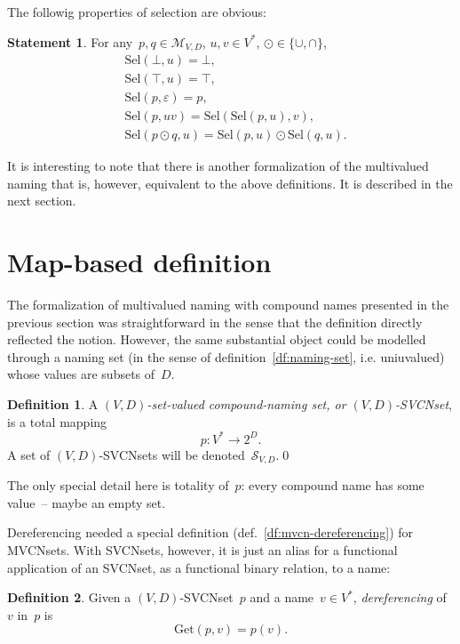 \documentclass{article}
\theoremstyle{definition}
\newtheorem{Df}{Definition}
\newtheorem{St}{Statement}
\newcommand{\setcharmvcn}{M}
\newcommand{\setcharsvcn}{S}
\newcommand{\setsymbol}[3]{\mathcal{#1}_{#2,#3}}
\newcommand{\setmvcn}[2]{\setsymbol{\setcharmvcn}{#1}{#2}}
\newcommand{\setsvcn}[2]{\setsymbol{\setcharsvcn}{#1}{#2}}
\newcommand{\select}{\mathrm{Sel}}
\newcommand{\derefsymbol}{\mathrm{Get}}
\newcommand{\deref}[2]{\derefsymbol(#1, #2)}
\begin{document}
The followig properties of selection are obvious:
\begin{St}\label{st:mvcn-selection-properties}
For any~$p,q\in\setmvcn{V}{D}$, $u, v\in V^\ast$, $\odot\in\{\cup, \cap\}$,
\begin{eqnarray*}
  & \select(\bot,u) = \bot, \\
  & \select(\top,u) = \top, \\
  & \select(p,\varepsilon) = p, \\
  & \select(p,uv) = \select(\select(p,u), v), \\
  & \select(p\odot q, u) = \select(p,u)\odot \select(q,u).
\end{eqnarray*}
\end{St}

It is interesting to note that there is another formalization of the
multivalued naming that is, however, equivalent to the above definitions.  It
is described in the next section.

\section{Map-based definition}

The formalization of multivalued naming with compound names presented in the
previous section was straightforward in the sense that the definition directly
reflected the notion. However, the same substantial object could be modelled
through a naming set (in the sense of definition~\ref{df:naming-set}, i.e.
uniuvalued) whose values are subsets of~$D$.

\begin{Df}\label{df:svcn}
A \emph{$(V,D)$-set-valued compound-naming set, or $(V,D)$-SVCNset}, is a total
mapping
\[
  p : V^\ast \to 2^D .
\]
A set of $(V,D)$-SVCNsets will be denoted~$\setsvcn{V}{D}$.\qed
\end{Df}

The only special detail here is totality of~$p$: every compound name has some
value~-- maybe an empty set.

Dereferencing needed a special definition (def.~\ref{df:mvcn-dereferencing})
for MVCNsets. With SVCNsets, however, it is just an alias for a functional
application of an SVCNset, as a functional binary relation, to a name:
\begin{Df}\label{df:svcn-dereferencing}
Given a $(V,D)$-SVCNset~$p$ and a name~$v\in V^\ast$, \emph{dereferencing}
of~$v$ in~$p$ is
\[
  \deref{p}{v} = p(v).
\]
\end{Df}
\end{document}
